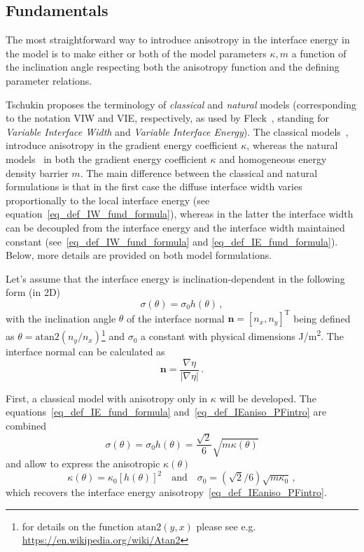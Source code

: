 	\subsection{Fundamentals}
	The most straightforward way to introduce anisotropy in the interface energy in the model is to make either or both of the model parameters $\kappa, m$ a function of the inclination angle respecting both the anisotropy function and the defining parameter relations. 
	
	Tschukin \cite{Tschukin2017} proposes the terminology of \textit{classical} and \textit{natural} models (corresponding to the notation VIW and VIE, respectively, as used by Fleck~\cite{Fleck2011}, standing for \textit{Variable Interface Width} and \textit{Variable Interface Energy}). The classical models~\cite{Kobayashi1993,McFadden1993,Taylor1998,Eggleston2001,Wheeler2006}, introduce anisotropy in the gradient energy coefficient $\kappa$, whereas the natural models~\cite{Ma2006,Torabi2009,Fleck2011,Moelans2008} in both the gradient energy coefficient $\kappa$ and homogeneous energy density barrier $m$. The main difference between the classical and natural formulations is that in the first case the diffuse interface width varies proportionally to the local interface energy (see equation~\eqref{eq_def_IW_fund_formula}), whereas in the latter the interface width can be decoupled from the interface energy and the interface width maintained constant (see~\eqref{eq_def_IW_fund_formula} and \eqref{eq_def_IE_fund_formula}). Below, more details are provided on both model formulations.
	
	Let's assume that the interface energy is inclination-dependent in the following form (in 2D)
	\begin{equation}\label{eq_def_IEaniso_PFintro}
		\sigma(\theta)=\sigma_0 h(\theta) \,,
	\end{equation}
	with the inclination angle $\theta$ of the interface normal $\bm{n}=[n_x,n_y]^\mathrm{T}$ being defined as $\theta = \mathrm{atan2}(n_y/n_x)$\footnote{for details on the function $\mathrm{atan2}(y,x)$ please see e.g. \url{https://en.wikipedia.org/wiki/Atan2}} and $\sigma_0$ a constant with physical dimensions \unit{\J/\m^2}. The interface normal can be calculated as
	\begin{equation}
		\bm{n} = \frac{\nabla\eta}{|\nabla\eta|} \,.
	\end{equation}
	
	First, a classical model with anisotropy only in $\kappa $ will be developed. The equations~\eqref{eq_def_IE_fund_formula} and~\eqref{eq_def_IEaniso_PFintro} are combined 
	\begin{equation}
		\sigma(\theta) = \sigma_0 h(\theta) = \frac{\sqrt{2}}{6}\sqrt{m\kappa(\theta)}
	\end{equation}
	and allow to express the anisotropic $\kappa(\theta)$
	\begin{equation}
		\kappa(\theta) = \kappa_0 [h(\theta)]^2 \quad \mathrm{and} \quad \sigma_0=(\sqrt{2}/6)\sqrt{m\kappa_0} \,,
	\end{equation}
	which recovers the interface energy anisotropy~\eqref{eq_def_IEaniso_PFintro}.
	
